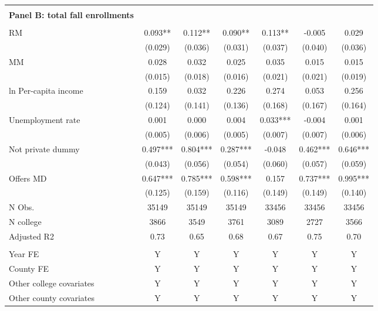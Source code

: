 \documentclass[12pt]{article}%
\begin{document}
\begin{table}[!htbp]
\begin{threeparttable}
\begin{tabular}{@{\extracolsep{-6pt}}lcccccc}
\hline  \\[-1.8ex] 
\textbf{Panel B: total fall enrollments}\\  \\[-1.8ex] 
RM & 0.093** & 0.112** & 0.090** & 0.113** & -0.005 & 0.029 \\
& (0.029) & (0.036) & (0.031) & (0.037) & (0.040) & (0.036) \\
MM & 0.028 & 0.032 & 0.025 & 0.035 & 0.015 & 0.015 \\
& (0.015) & (0.018) & (0.016) & (0.021) & (0.021) & (0.019) \\
ln Per-capita income & 0.159 & 0.032 & 0.226 & 0.274 & 0.053 & 0.256 \\
& (0.124) & (0.141) & (0.136) & (0.168) & (0.167) & (0.164) \\
Unemployment rate & 0.001 & 0.000 & 0.004 & 0.033*** & -0.004 & 0.001 \\
& (0.005) & (0.006) & (0.005) & (0.007) & (0.007) & (0.006) \\
Not private dummy & 0.497*** & 0.804*** & 0.287*** & -0.048 & 0.462*** &
0.646*** \\
& (0.043) & (0.056) & (0.054) & (0.060) & (0.057) & (0.059) \\
Offers MD & 0.647*** & 0.785*** & 0.598*** & 0.157 & 0.737*** &
0.995*** \\
& (0.125) & (0.159) & (0.116) & (0.149) & (0.149) & (0.140) \\
\hline
N Obs. & 35149 & 35149 & 35149 & 33456 & 33456 & 33456 \\
N college & 3866 & 3549 & 3761 & 3089 & 2727 & 3566 \\
Adjusted R2 & 0.73 & 0.65 & 0.68 & 0.67 & 0.75 & 0.70 \\
\midrule  \\[-1.8ex]   
Year FE & Y & Y & Y & Y & Y & Y \\
County FE & Y & Y & Y & Y & Y & Y \\
Other college covariates & Y & Y & Y & Y & Y & Y \\
Other county covariates & Y & Y & Y & Y & Y & Y \\
\bottomrule
\end{tabular}
  \end{threeparttable}
\end{table}
\FloatBarrier
\end{document}
